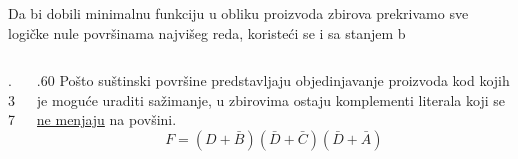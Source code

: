 \begin{frame}[label=02-s044]
Da bi dobili minimalnu funkciju u obliku proizvoda zbirova prekrivamo sve logičke nule površinama najvišeg reda, koristeći se i sa stanjem b

\begin{columns}[c,onlytextwidth]
\begin{column}{.37\textwidth}\centering

\end{column}
\begin{column}{.60\textwidth}
Pošto suštinski površine predstavljaju objedinjavanje proizvoda kod kojih je moguće uraditi sažimanje, u zbirovima ostaju komplementi literala koji se \alert{\underline{ne menjaju}} na povšini.
{\fontsize{10}{12}\selectfont\[
F=(D+\bar B)(\bar D+\bar C)(\bar D+\bar A)
\]}
\end{column}
\end{columns}
\end{frame}
